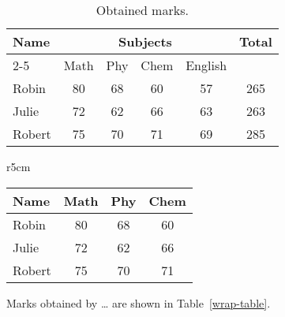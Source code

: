 \documentclass{article}
\begin{document}

\begin{table}[!hbt]
    \centering
    \caption{Obtained marks.}
    \label{tab-marks}

    \begin{tabular}{|l|*{5}{c|}}
        \hline \multirow{2}{*}{Name} & \multicolumn{4}{c|}{Subjects} &
        \multirow{2}{*}{Total}                                                                    \\
        \cline{2-5}                  & Math                          & Phy & Chem & English &     \\
        \hline
        \hline Robin                 & 80                            & 68  & 60   & 57      & 265 \\
        \hline Julie                 & 72                            & 62  & 66   & 63      & 263 \\
        \hline Robert                & 75                            & 70  & 71   & 69      & 285 \\
        \hline
    \end{tabular}
\end{table}


\begin{wraptable}{r}{5cm}
    \centering
    \caption{Obtained marks.}
    \label{wrap-table}
    \begin{tabular}{|l|c|c|c|}
        \hline Name   & Math & Phy & Chem \\
        \hline Robin  & 80   & 68  & 60   \\
        \hline Julie  & 72   & 62  & 66   \\
        \hline Robert & 75   & 70  & 71   \\
        \hline
    \end{tabular}
\end{wraptable}
Marks obtained by … are shown in
Table~\ref{wrap-table}.
\lipsum[1]

\end{document}
